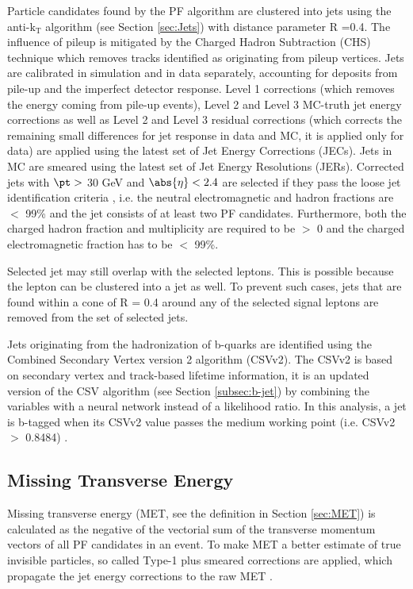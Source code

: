 Particle candidates found by the PF algorithm are clustered into jets using the anti-$\mathrm{k_T}$ algorithm (see Section \ref{sec:Jets})
 with distance parameter R =0.4. The influence of pileup is mitigated by the Charged
Hadron Subtraction (CHS) technique which removes tracks identified as originating from pileup vertices. Jets are calibrated
in simulation and in data separately, accounting for deposits from pile-up and the imperfect detector response.
Level 1 corrections (which removes the energy coming from pile-up events), Level 2 and Level 3 MC-truth jet energy corrections as well as Level 2 and Level 3 residual corrections (which corrects the remaining small differences for jet response in data and MC, it is applied only for data) are applied using the latest set of Jet Energy Corrections (JECs).
Jets in MC are smeared using the latest set of Jet Energy Resolutions (JERs).
Corrected jets with $\pt >$ 30 GeV and $\abs{\eta} <2.4$ are selected if they pass the
loose jet identification criteria \cite{jetid}, i.e. the neutral electromagnetic and hadron fractions are
 $<$ 99\% and the jet consists of at least two PF candidates. Furthermore, both the charged hadron
fraction and multiplicity are required to be $>$ 0 and the charged electromagnetic fraction has to be $<$ 99\%.

Selected jet may still overlap with the selected leptons. This is possible because the lepton
can be clustered into a jet as well. To prevent such cases, jets that are found within a cone of
R = 0.4 around any of the selected signal leptons are removed from the set of selected jets.

Jets originating from the hadronization of b-quarks are identified using the Combined Secondary Vertex version 2 algorithm (CSVv2). The CSVv2 is based on secondary vertex and track-based lifetime information, it is an updated version of the CSV algorithm (see Section \ref{subsec:b-jet}) by combining the variables with a neural network instead of a likelihood ratio. In this analysis, a jet is b-tagged when its CSVv2 value passes the medium working point (i.e. CSVv2 $>$ 0.8484) \cite{bjet}.


\subsection{Missing Transverse Energy}

Missing transverse energy (MET, see the definition in Section \ref{sec:MET}) is calculated as the negative of the vectorial sum of the transverse
momentum vectors of all PF candidates in an event. To make MET a better estimate of true
invisible particles, so called Type-1 plus smeared corrections are applied, which propagate the jet energy
corrections to the raw MET \cite{metcor}.


